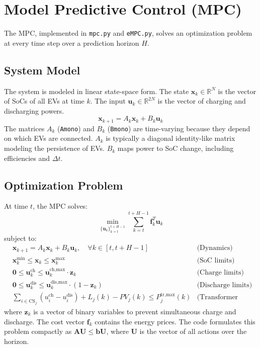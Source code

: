\newpage
\section{Model Predictive Control (MPC)}
The MPC, implemented in \texttt{mpc.py} and \texttt{eMPC.py}, solves an optimization problem at every time step over a prediction horizon $H$.

\subsection{System Model}
The system is modeled in linear state-space form. The state $\mathbf{x}_k \in \mathbb{R}^N$ is the vector of SoCs of all EVs at time $k$. The input $\mathbf{u}_k \in \mathbb{R}^{2N}$ is the vector of charging and discharging powers.
\[
\mathbf{x}_{k+1} = A_k \mathbf{x}_k + B_k \mathbf{u}_k
\]
The matrices $A_k$ (\texttt{Amono}) and $B_k$ (\texttt{Bmono}) are time-varying because they depend on which EVs are connected. $A_k$ is typically a diagonal identity-like matrix modeling the persistence of EVs. $B_k$ maps power to SoC change, including efficiencies and $\Delta t$.

\subsection{Optimization Problem}
At time $t$, the MPC solves:
\[
\min_{\{\mathbf{u}_k\}_{k=t}^{t+H-1}} \sum_{k=t}^{t+H-1} \mathbf{f}_k^T \mathbf{u}_k
\]
subject to:
\begin{align*}
    & \mathbf{x}_{k+1} = A_k \mathbf{x}_k + B_k \mathbf{u}_k, \quad \forall k \in [t, t+H-1] & \text{(Dynamics)} \\
    & \mathbf{x}^{\text{min}}_k \le \mathbf{x}_k \le \mathbf{x}^{\text{max}}_k & \text{(SoC limits)} \\
    & \mathbf{0} \le \mathbf{u}^{\text{ch}}_k \le \mathbf{u}^{\text{ch,max}}_k \cdot \mathbf{z}_k & \text{(Charge limits)} \\
    & \mathbf{0} \le \mathbf{u}^{\text{dis}}_k \le \mathbf{u}^{\text{dis,max}}_k \cdot (1 - \mathbf{z}_k) & \text{(Discharge limits)} \\
    & \sum_{i \in \text{CS}_j} (u^{\text{ch}}_i - u^{\text{dis}}_i) + L_j(k) - PV_j(k) \le P_j^{\text{tr,max}}(k) & \text{(Transformer limits)}
\end{align*}
where $\mathbf{z}_k$ is a vector of binary variables to prevent simultaneous charge and discharge. The cost vector $\mathbf{f}_k$ contains the energy prices. The code formulates this problem compactly as $\mathbf{AU} \le \mathbf{bU}$, where $\mathbf{U}$ is the vector of all actions over the horizon.

